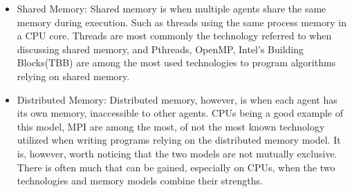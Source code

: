 \begin{itemize}
	\item{Shared Memory:}
	Shared memory is when multiple agents share the same memory during execution. Such as threads using the same process memory in a CPU core.
	Threads are most commonly the technology referred to when discussing shared memory, and Pthreads, OpenMP, Intel's Building Blocks\texttrademark (TBB) are among the most used technologies to program algorithms relying on shared memory.
	\item{Distributed Memory:}
		Distributed memory, however, is when each agent has its own memory, inaccessible to other agents.
		CPUs being a good example of this model, MPI are among the most, of not the most known technology utilized when writing programs relying on the distributed memory model.
		It is, however, worth noticing that the two models are not mutually exclusive.
		There is often much that can be gained, especially on CPUs, when the two technologies and memory models combine their strengths.
\end{itemize}
